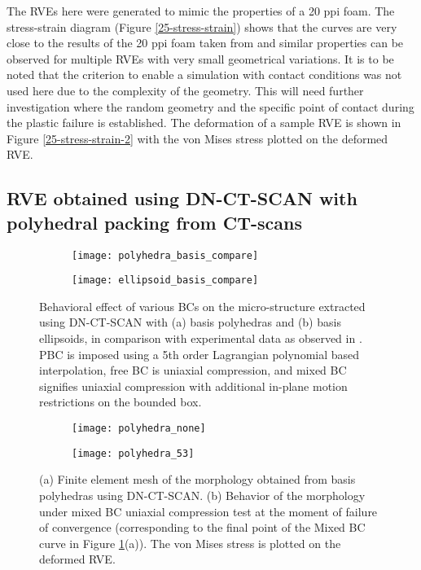 The RVEs here were generated to mimic the properties of a 20 ppi foam. The stress-strain diagram (Figure \ref{25-stress-strain}) shows that the curves are very close to the results of the 20 ppi foam taken from \cite{jungMicrostructuralCharacterisationExperimental2017} and similar properties can be observed for multiple RVEs with very small geometrical variations.
It is to be noted that the criterion to enable a simulation with contact conditions was not used here due to the complexity of the geometry. This will need further investigation where the random geometry and the specific point of contact during the plastic failure is established. The deformation of a sample RVE is shown in Figure \ref{25-stress-strain-2} with the von Mises stress plotted on the deformed RVE.



\subsection{RVE obtained using DN-CT-SCAN with polyhedral packing from CT-scans}\label{res-ct-fem}

\begin{figure}
	\centering
	\begin{subfigure}{0.49\textwidth}
		\texttt{[image: polyhedra\_basis\_compare]}
	\end{subfigure}
	\begin{subfigure}{0.49\textwidth}
		\texttt{[image: ellipsoid\_basis\_compare]}
	\end{subfigure}
	\caption{Behavioral effect of various BCs on the micro-structure extracted using DN-CT-SCAN with (a) basis polyhedras and (b) basis ellipsoids, in comparison with experimental data as observed in \cite{jungMicrostructuralCharacterisationExperimental2017}. PBC is imposed using a 5th order Lagrangian polynomial based interpolation, free BC is uniaxial compression, and mixed BC signifies uniaxial compression with additional in-plane motion restrictions on the bounded box.}\label{fig-compare-polyelli}
\end{figure}


\begin{figure}
	\centering
	\begin{subfigure}[b]{0.42\textwidth}
		\texttt{[image: polyhedra\_none]}
		\caption{}
	\end{subfigure}
	\begin{subfigure}[b]{0.43\textwidth}
		\texttt{[image: polyhedra\_53]}
		\caption{}
	\end{subfigure}
	\caption{(a) Finite element mesh of the morphology obtained from basis polyhedras using DN-CT-SCAN. (b) Behavior of the morphology under mixed BC uniaxial compression test at the moment of failure of convergence (corresponding to the final point of the Mixed BC curve in Figure \ref{fig-compare-polyelli}(a)). The von Mises stress is plotted on the deformed RVE.}\label{fig-snapshot-polyhedra-mbc}
\end{figure}

